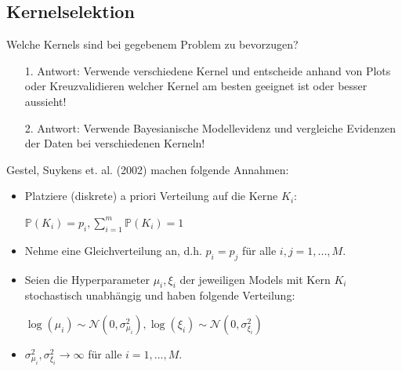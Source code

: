 \documentclass{beamer}
\begin{document}
{\begin{frame}


\end{frame}

\subsection{Kernelselektion}

\begin{frame}
Welche Kernels sind bei gegebenem Problem zu bevorzugen?\\
	\begin{itemize}
		\item[1.]Antwort: Verwende verschiedene Kernel und entscheide anhand von Plots oder Kreuzvalidieren welcher Kernel am besten geeignet ist oder besser aussieht!
		\item[2.]Antwort: Verwende Bayesianische Modellevidenz und vergleiche Evidenzen der Daten bei verschiedenen Kerneln!
	\end{itemize}
\end{frame}

\begin{frame}
Gestel, Suykens et. al. (2002) machen folgende Annahmen:
\begin{itemize}
	\item Platziere (diskrete) a priori Verteilung auf die Kerne $K_i$:
		\begin{center}
			$\mathbb{P}(K_i) = p_i, \sum_{i=1}^{m} \mathbb{P}(K_i) = 1$
		\end{center}
	\item Nehme eine Gleichverteilung an, d.h. $p_i = p_j$ für alle $i,j = 1,...,M$.
	\item Seien die Hyperparameter $\mu_i, \xi_i$ der jeweiligen Models mit Kern $K_i$ 				  stochastisch unabhängig und haben folgende Verteilung:
		  \begin{center}
				$\log(\mu_i) \sim \mathcal{N}(0, \sigma_{\mu_i}^2), \log(\xi_i) \sim 						\mathcal{N}(0, \sigma_{\xi_i}^2)$ 
		  \end{center}
	\item $\sigma_{\mu_i}^2, \sigma_{\xi_i}^2 \rightarrow \infty$ für alle $i = 1,...,M				   $.
\end{itemize}
\end{frame}


}
\end{document}
